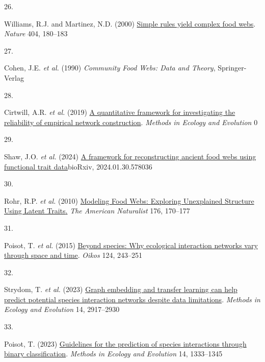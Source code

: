\documentclass[
]{article}
\newlength{\cslhangindent}
\newlength{\csllabelwidth}
\newenvironment{CSLReferences}[2] %
 {\begin{list}{}{%
  \setlength{\itemindent}{0pt}
  \setlength{\leftmargin}{0pt}
  \setlength{\parsep}{0pt}
  \ifodd #1
   \setlength{\leftmargin}{\cslhangindent}
   \setlength{\itemindent}{-1\cslhangindent}
  \fi
  \setlength{\itemsep}{#2\baselineskip}}}
 {\end{list}}
\newcommand{\CSLLeftMargin}[1]{\parbox[t]{\csllabelwidth}{\strut#1\strut}}
\newcommand{\CSLRightInline}[1]{\parbox[t]{\linewidth - \csllabelwidth}{\strut#1\strut}}
\begin{document}
\begin{CSLReferences}{0}{0}
\CSLLeftMargin{26. }%
\CSLRightInline{Williams, R.J. and Martinez, N.D. (2000)
\href{https://doi.org/10.1038/35004572}{Simple rules yield complex food
webs}. \emph{Nature} 404, 180--183}

\CSLLeftMargin{27. }%
\CSLRightInline{Cohen, J.E. \emph{et al.} (1990) \emph{Community {Food
Webs}: {Data} and {Theory}}, Springer-Verlag}

\CSLLeftMargin{28. }%
\CSLRightInline{Cirtwill, A.R. \emph{et al.} (2019)
\href{https://doi.org/10.1111/2041-210X.13180}{A quantitative framework
for investigating the reliability of empirical network construction}.
\emph{Methods in Ecology and Evolution} 0}

\CSLLeftMargin{29. }%
\CSLRightInline{Shaw, J.O. \emph{et al.} (2024)
\href{https://doi.org/10.1101/2024.01.30.578036}{A framework for
reconstructing ancient food webs using functional trait data}bioRxiv,
2024.01.30.578036}

\CSLLeftMargin{30. }%
\CSLRightInline{Rohr, R.P. \emph{et al.} (2010)
\href{https://doi.org/10.1086/653667}{Modeling {Food Webs}: {Exploring
Unexplained Structure Using Latent Traits}.} \emph{The American
Naturalist} 176, 170--177}

\CSLLeftMargin{31. }%
\CSLRightInline{Poisot, T. \emph{et al.} (2015)
\href{https://doi.org/10.1111/oik.01719}{Beyond species: Why ecological
interaction networks vary through space and time}. \emph{Oikos} 124,
243--251}

\CSLLeftMargin{32. }%
\CSLRightInline{Strydom, T. \emph{et al.} (2023)
\href{https://doi.org/10.1111/2041-210X.14228}{Graph embedding and
transfer learning can help predict potential species interaction
networks despite data limitations}. \emph{Methods in Ecology and
Evolution} 14, 2917--2930}

\CSLLeftMargin{33. }%
\CSLRightInline{Poisot, T. (2023)
\href{https://doi.org/10.1111/2041-210X.14071}{Guidelines for the
prediction of species interactions through binary classification}.
\emph{Methods in Ecology and Evolution} 14, 1333--1345}


\end{CSLReferences}
\end{document}
